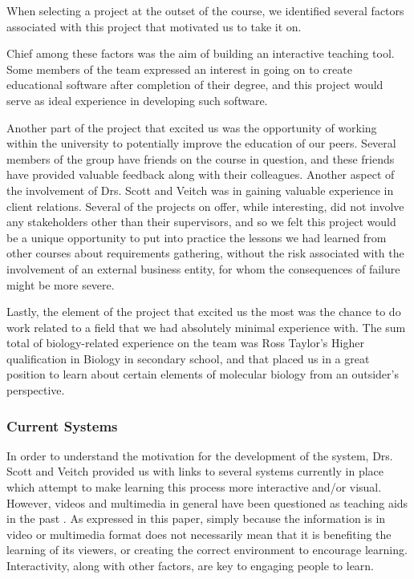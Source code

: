 When selecting a project at the outset of the course, we identified
several factors associated with this project that motivated us to take 
it on.

Chief among these factors was the aim of building an interactive teaching
tool. Some members of the team expressed an interest in going on to
create educational software after completion of their degree, and this
project would serve as ideal experience in developing such software.

Another part of the project that excited us was the opportunity of working
within the university to potentially improve the education of our peers.
Several members of the group have friends on the course in question, and
these friends have provided valuable feedback along with their colleagues.
Another aspect of the involvement of Drs. Scott and Veitch was in gaining
valuable experience in client relations. Several of the projects on offer,
while interesting, did not involve any stakeholders other than their 
supervisors, and so we felt this project would be a unique opportunity to
put into practice the lessons we had learned from other courses about
requirements gathering, without the risk associated with the involvement
of an external business entity, for whom the consequences of failure might
be more severe.

Lastly, the element of the project that excited us the most was the chance
to do work related to a field that we had absolutely minimal experience
with. The sum total of biology-related experience on the team was Ross 
Taylor's Higher qualification in Biology in secondary school, and that
placed us in a great position to learn about certain elements of
molecular biology from an outsider's perspective. 

\subsubsection{Current Systems}
In order to understand the motivation for the development of the
system, Drs. Scott and Veitch provided us with links to several systems 
currently in place which attempt to make learning this process more 
interactive and/or visual. However, videos and multimedia in general 
have been questioned as teaching aids in the past 
\citep{gamingRedefines2004}. As expressed in this paper, simply because 
the information is in video or multimedia format does not necessarily 
mean that it is benefiting the learning of its viewers, or creating the 
correct environment to encourage learning. Interactivity, along with 
other factors, are key to engaging people to learn.

